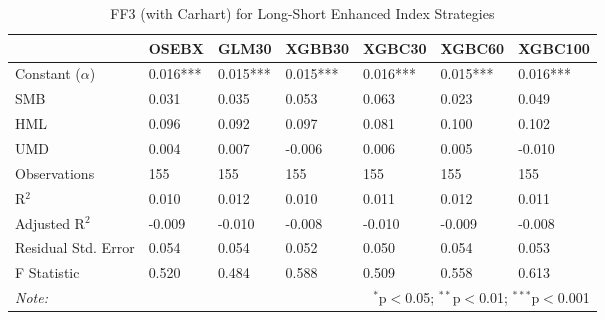 \begin{table}[H] 
\centering 
  \caption{FF3 (with Carhart) for Long-Short Enhanced Index Strategies} 
  \vspace{1em}
  \label{table:enhanced-ff3-selected-long-short} 
\begin{tabularx}{\textwidth}{lXXXXXX} 
\toprule 
 & OSEBX & GLM30 & XGBB30 & XGBC30 & XGBC60 & XGBC100 \\ 
\midrule
Constant ($\alpha$) & \cellcolor{lightlightgreen}0.016*** & 0.015*** & 0.015*** & \cellcolor{lightlightgreen}0.016*** & 0.015*** & \cellcolor{lightlightgreen}0.016*** \\ 
SMB & 0.031 & 0.035 & 0.053 & 0.063 & 0.023 & 0.049 \\ 
HML & 0.096 & 0.092 & 0.097 & 0.081 & 0.100 & 0.102 \\ 
UMD & 0.004 & 0.007 & -0.006 & 0.006 & 0.005 & -0.010 \\ 
\midrule 
Observations & 155 & 155 & 155 & 155 & 155 & 155 \\ 
R$^{2}$ & 0.010 & 0.012 & 0.010 & 0.011 & 0.012 & 0.011 \\ 
Adjusted R$^{2}$ & -0.009 & -0.010 & -0.008 & -0.010 & -0.009 & -0.008 \\ 
Residual Std. Error & 0.054 & 0.054 & 0.052 & 0.050 & 0.054 & 0.053 \\ 
F Statistic & 0.520 & 0.484 & 0.588 & 0.509 & 0.558 & 0.613 \\ 
\bottomrule 
\textit{Note:} & \multicolumn{6}{r}{$^{*}$p$<$0.05; $^{**}$p$<$0.01; $^{***}$p$<$0.001} \\ 
\end{tabularx} 
\end{table}



